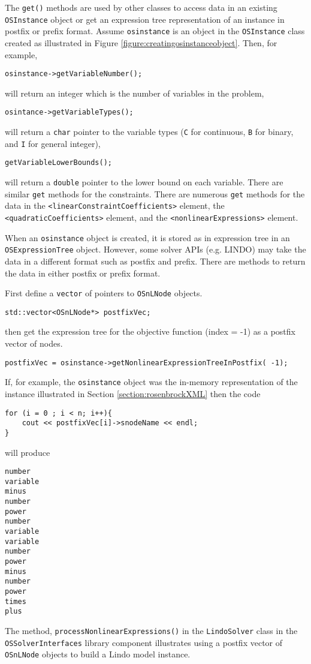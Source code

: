 \documentclass[11pt]{article}
\newcounter{Fig}
\renewcommand{\_}{{\char"5F}}
\renewcommand{\{}{{\char"7B}}
\renewcommand{\}}{{\char"7D}}
\renewcommand{\^}{{\char"0D}}
\renewcommand{\'}{{\char"0D}}
\begin{document}
The {\tt get()} methods are used by other classes to access data in an existing {\tt OSInstance} object or get an expression tree representation of an instance in postfix or prefix format.   Assume {\tt osinstance} is an object in the {\tt OSInstance} class created as illustrated in Figure \ref{figure:creatingosinstanceobject}. Then, for example, 
\begin{verbatim}
osinstance->getVariableNumber();
\end{verbatim}
will return an integer which is the number of variables in the problem, 
\begin{verbatim}
osintance->getVariableTypes();
\end{verbatim}
will return a {\tt char} pointer to the variable types ({\tt C} for continuous, {\tt B} for binary, and {\tt I} for general integer),
\begin{verbatim}
getVariableLowerBounds();
\end{verbatim}
will  return a {\tt double} pointer to the lower bound on each variable. There are similar {\tt get} methods for the constraints. There are numerous {\tt get} methods for the data in the {\tt <linearConstraintCoefficients>}  element, the {\tt <quadraticCoefficients>} element, and the {\tt <nonlinearExpressions>} element. 

When an {\tt osinstance} object is created, it is stored as in expression tree in an {\tt OSExpressionTree} object. However, some solver APIs (e.g. LINDO) may take the data in a different format such as postfix and prefix. There are methods to return the data in either postfix or prefix format. 

First define a {\tt vector} of pointers to {\tt OSnLNode} objects.
\begin{verbatim}
std::vector<OSnLNode*> postfixVec;
\end{verbatim}
then get the expression tree for the objective function (index = -1) as a postfix vector of nodes. 
\begin{verbatim}
postfixVec = osinstance->getNonlinearExpressionTreeInPostfix( -1);
\end{verbatim}
If, for example, the {\tt osinstance} object was the in-memory representation of   the instance illustrated in  Section \ref{section:rosenbrockXML} then the code
\begin{verbatim}
for (i = 0 ; i < n; i++){
	cout << postfixVec[i]->snodeName << endl;	
}
\end{verbatim}
will produce
\begin{verbatim}
number
variable
minus
number
power
number
variable
variable
number
power
minus
number
power
times
plus
\end{verbatim}
The method, {\tt processNonlinearExpressions()} in the {\tt LindoSolver} class in the {\tt OSSolverInterfaces} library component illustrates using a postfix vector of {\tt OSnLNode} objects to build a Lindo model instance.
\end{document}
